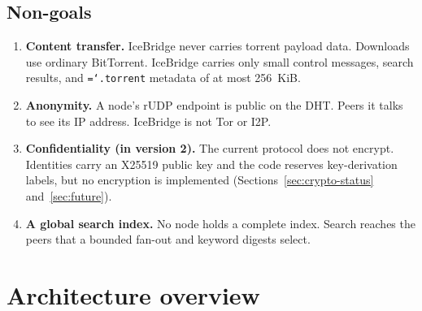 \documentclass[11pt,a4paper]{article}
\newcommand{\code}[1]{\texttt{\hyphenchar\font=`\-\relax #1}}
\DeclareRobustCommand{\_}{\origunderscore\allowbreak}
\begin{document}
\subsection{Non-goals}
\begin{enumerate}
\item \textbf{Content transfer.} IceBridge never carries torrent payload data. Downloads use
  ordinary BitTorrent. IceBridge carries only small control messages, search results, and
  \code{.torrent} metadata of at most 256~KiB.
\item \textbf{Anonymity.} A node's rUDP endpoint is public on the DHT. Peers it talks to
  see its IP address. IceBridge is not Tor or I2P.
\item \textbf{Confidentiality (in version 2).} The current protocol does not encrypt.
  Identities carry an X25519 public key and the code reserves key-derivation labels, but no
  encryption is implemented (Sections~\ref{sec:crypto-status} and~\ref{sec:future}).
\item \textbf{A global search index.} No node holds a complete index. Search reaches the
  peers that a bounded fan-out and keyword digests select.
\end{enumerate}

\section{Architecture overview}
\end{document}
